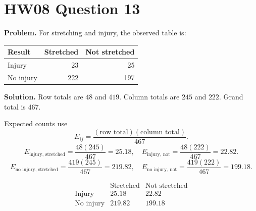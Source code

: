 \documentclass[11pt]{article}
\begin{document}
\section*{HW08 Question 13}

\textbf{Problem.} For stretching and injury, the observed table is:

\begin{center}
\begin{tabular}{lrr}
\toprule
Result & Stretched & Not stretched\\
\midrule
Injury & 23 & 25\\
No injury & 222 & 197\\
\bottomrule
\end{tabular}
\end{center}

\textbf{Solution.}
Row totals are \(48\) and \(419\). Column totals are \(245\) and \(222\). Grand total is \(467\).

Expected counts use
\[
E_{ij}=\frac{(\text{row total})(\text{column total})}{467}.
\]
\[
E_{\text{injury, stretched}}=\frac{48(245)}{467}=25.18,\quad
E_{\text{injury, not}}=\frac{48(222)}{467}=22.82.
\]
\[
E_{\text{no injury, stretched}}=\frac{419(245)}{467}=219.82,\quad
E_{\text{no injury, not}}=\frac{419(222)}{467}=199.18.
\]

\[
\boxed{
\begin{array}{c|cc}
 & \text{Stretched} & \text{Not stretched}\\ \hline
\text{Injury} & 25.18 & 22.82\\
\text{No injury} & 219.82 & 199.18
\end{array}}
\]
\end{document}
